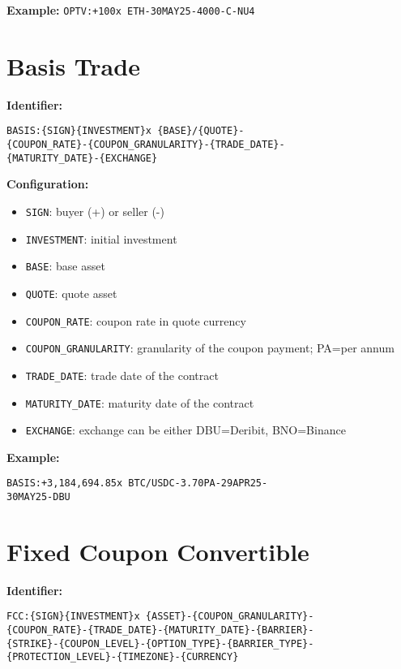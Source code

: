 \documentclass{article}
\begin{document}
\textbf{Example:} \texttt{OPTV:+100x ETH-30MAY25-4000-C-NU4}

\section{Basis Trade}
\textbf{Identifier:} 
\begin{small}
\texttt{BASIS:\{SIGN\}\{INVESTMENT\}x \{BASE\}/\{QUOTE\}-}\\
\texttt{\{COUPON\_RATE\}-\{COUPON\_GRANULARITY\}-\{TRADE\_DATE\}-}\\
\texttt{\{MATURITY\_DATE\}-\{EXCHANGE\}}
\end{small}

\textbf{Configuration:}
\begin{itemize}
    \item \texttt{SIGN}: buyer (+) or seller (-)
    \item \texttt{INVESTMENT}: initial investment
    \item \texttt{BASE}: base asset
    \item \texttt{QUOTE}: quote asset
    \item \texttt{COUPON\_RATE}: coupon rate in quote currency
    \item \texttt{COUPON\_GRANULARITY}: granularity of the coupon payment; PA=per annum
    \item \texttt{TRADE\_DATE}: trade date of the contract
    \item \texttt{MATURITY\_DATE}: maturity date of the contract
    \item \texttt{EXCHANGE}: exchange can be either DBU=Deribit, BNO=Binance
\end{itemize}

\textbf{Example:} 
\begin{small}
\texttt{BASIS:+3,184,694.85x BTC/USDC-3.70PA-29APR25-}\\
\texttt{30MAY25-DBU}
\end{small}

\section{Fixed Coupon Convertible}
\textbf{Identifier:} 
\begin{small}
\texttt{FCC:\{SIGN\}\{INVESTMENT\}x \{ASSET\}-\{COUPON\_GRANULARITY\}-}\\
\texttt{\{COUPON\_RATE\}-\{TRADE\_DATE\}-\{MATURITY\_DATE\}-\{BARRIER\}-}\\
\texttt{\{STRIKE\}-\{COUPON\_LEVEL\}-\{OPTION\_TYPE\}-\{BARRIER\_TYPE\}-}\\
\texttt{\{PROTECTION\_LEVEL\}-\{TIMEZONE\}-\{CURRENCY\}}
\end{small}
\end{document}
